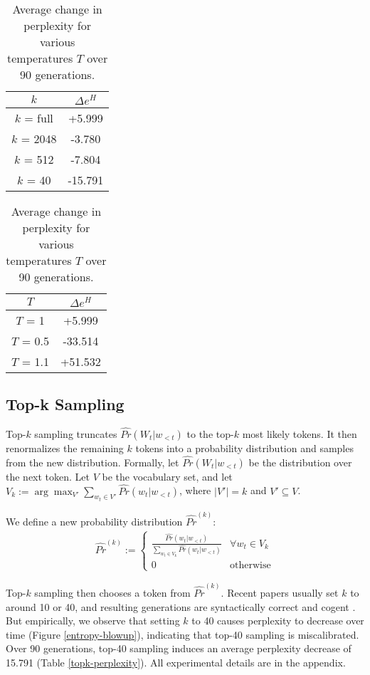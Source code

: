 \documentclass[pageno]{jpaper}
\begin{document}
\begin{table}[ht]
    \centering
    \begin{tabular}[t]{cc}
    $k$ & $\Delta e^H$  \\
    \hline
    \hline
    $k$ = full & +5.999 \\
    $k$ = 2048 & -3.780 \\
    $k$ = 512 & -7.804 \\
    $k$ = 40 & -15.791 
    \end{tabular}
    \caption{Average change in perplexity for various $k$ over 90 generations.}
    \label{topk-perplexity}
    \begin{tabular}[t]{cc}
    $T$ & $\Delta e^H$ \\
    \hline
    \hline
    $T$ = 1 & +5.999\\
    $T$ = 0.5 & -33.514 \\
    $T$ = 1.1 & +51.532
    \end{tabular}
    \caption{Average change in perplexity for various temperatures $T$ over 90 generations.}
    \label{temp-perplexity}
\end{table}

\subsection{Top-k Sampling}

Top-$k$ sampling truncates $\widehat{Pr}(W_t|w_{<t})$ to the top-$k$ most likely tokens. It then renormalizes the remaining $k$ tokens into a probability distribution and samples from the new distribution. Formally, let $\widehat{Pr}(W_t|w_{<t})$ be the distribution over the next token. Let $V$ be the vocabulary set, and let $V_k := \arg \max_{V'} \sum_{w_t \in V'} \widehat{Pr}(w_t | w_{<t})$, where $|V'| = k$ and $V' \subseteq V$. 

We define a new probability distribution $\widehat{Pr}^{(k)}$:
\begin{align*}
    \widehat{Pr}^{(k)} := \begin{cases}
        \frac{\widehat{Pr}(w_t | w_{<t})}{\sum_{w_t \in V_k} \widehat{Pr}(w_t |w_{<t})} & \forall w_t \in V_k \\
        0 & \text{otherwise}
    \end{cases}
\end{align*}

Top-$k$ sampling then chooses a token from $\widehat{Pr}^{(k)}$. Recent papers usually set $k$ to around 10 or 40, and resulting generations are syntactically correct and cogent \cite{k10,radford2019language}. But empirically, we observe that setting $k$ to 40 causes perplexity to decrease over time (Figure \ref{entropy-blowup}), indicating that top-40 sampling is miscalibrated. Over 90 generations, top-40 sampling induces an average perplexity decrease of 15.791 (Table \ref{topk-perplexity}). All experimental details are in the appendix.
\end{document}
